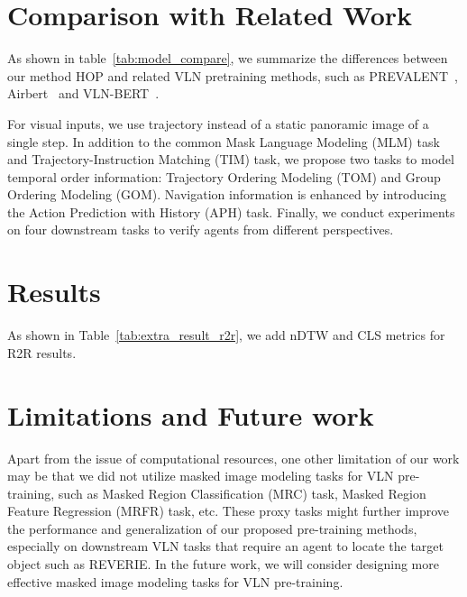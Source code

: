 \documentclass[10pt,twocolumn,letterpaper]{article}
\begin{document}
\section{Comparison with Related Work}
As shown in table~\ref{tab:model_compare}, we summarize the differences between our method HOP and related VLN pretraining methods, such as PREVALENT~\cite{prevalent}, Airbert~\cite{airbert} and VLN-BERT~\cite{bertvln}.

For visual inputs, we use trajectory instead of a static panoramic image of a single step. In addition to the common Mask Language Modeling (MLM) task and Trajectory-Instruction Matching (TIM) task, we propose two tasks to model temporal order information: Trajectory Ordering Modeling (TOM) and Group Ordering Modeling (GOM). Navigation information is enhanced by introducing the Action Prediction with History (APH) task. Finally, we conduct experiments on four downstream tasks to verify agents from different perspectives.

\section{Results}
As shown in Table~\ref{tab:extra_result_r2r}, we add nDTW and CLS metrics for R2R results.  
\vspace{0pt}

\begin{table}[!h]
\centering
{}
\vspace{-1mm}
\caption{
Performance of HOP on R2R.
}
\vspace{0mm}
\label{tab:extra_result_r2r}
\end{table}

\section{Limitations and Future work}
Apart from the issue of computational resources, one other limitation of our work may be that we did not utilize masked image modeling tasks  for VLN pre-training, such as Masked Region Classification (MRC) task, Masked Region Feature Regression (MRFR) task, etc. These proxy tasks might further improve the performance and generalization of our proposed pre-training methods, especially on downstream VLN tasks that require an agent to locate the target object such as REVERIE. In the future work, we will consider designing more effective masked image modeling tasks for VLN pre-training.
\end{document}

